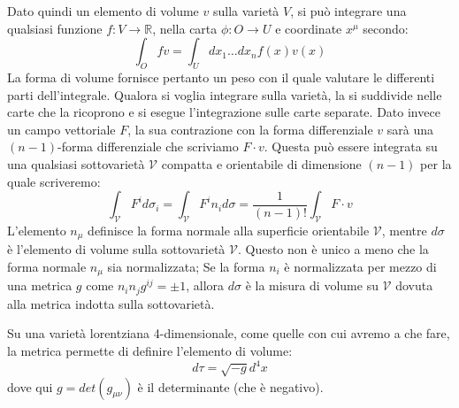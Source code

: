 Dato quindi un elemento di volume $v$ sulla varietà $V$, si può integrare una qualsiasi funzione $f : V \rightarrow \mathbb{R}$, nella carta $\phi : O \rightarrow U$  e coordinate $x^\mu$ secondo:
\begin{equation*}
    \int_O fv = \int_U dx_1 \dots dx_n f(x) v(x)
\end{equation*}
La forma di volume fornisce pertanto un peso con il quale valutare le differenti parti dell'integrale. Qualora si voglia integrare sulla varietà, la si suddivide nelle carte che la ricoprono e si esegue l'integrazione sulle carte separate.
Dato invece un campo vettoriale $F$, la sua contrazione con la forma differenziale $v$ sarà una $(n-1)$-forma differenziale che scriviamo $F\cdot v$. Questa può essere integrata su una qualsiasi sottovarietà $\mathcal{V}$ compatta e orientabile di dimensione $(n-1)$ per la quale scriveremo:
\begin{equation*}
    \int_\mathcal{V} F^i d\sigma_i =\int_\mathcal{V}F^i n_i d\sigma = \frac{1}{(n-1)!}\int_\mathcal{V} F\cdot v
\end{equation*}
L'elemento $n_\mu$ definisce la forma normale alla superficie orientabile $\mathcal{V}$, mentre $d\sigma$ è l'elemento di volume sulla sottovarietà $\mathcal{V}$. Questo non è unico a meno che la forma normale $n_\mu$ sia normalizzata; Se la forma $n_i$ è normalizzata per mezzo di una metrica $g$ come $n_i n_j g^{ij} = \pm 1$, allora $d\sigma$ è la misura di volume su $\mathcal{V}$ dovuta alla metrica indotta sulla sottovarietà.

Su una varietà lorentziana 4-dimensionale, come quelle con cui avremo a che fare, la metrica permette di definire l'elemento di volume:
\begin{equation*}
    d\tau = \sqrt{-g} d^4x
\end{equation*}
dove qui $g= det(g_{\mu\nu})$ è il determinante (che è negativo).

